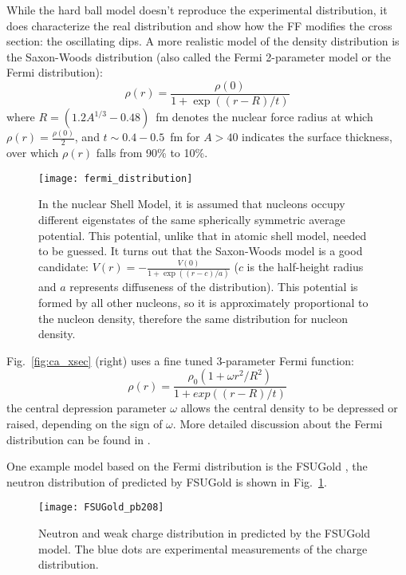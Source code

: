 While the hard ball model doesn't reproduce the experimental distribution, it does
characterize the real distribution and show how the FF modifies the cross section:
the oscillating dips. A more realistic model of the density distribution is the
Saxon-Woods distribution (also called the Fermi 2-parameter model or the Fermi
distribution):
\begin{equation}
    \rho(r) = \frac{\rho(0)}{1 + \exp((r-R)/t)}
\end{equation}
where $R = (1.2A^{1/3} - 0.48)$~fm denotes the nuclear force radius at which 
$\rho(r) = \frac{\rho(0)}{2}$,
and $t \sim 0.4-0.5$~fm for  $A > 40$ indicates the surface thickness, 
over which $\rho(r)$ falls from 90\% to 10\%.
\begin{figure}[!h]
    \centering
    \texttt{[image: fermi\_distribution]}
    \caption{In the nuclear Shell Model, it is assumed that nucleons occupy 
    different eigenstates of the same spherically symmetric average potential.
    This potential, unlike that in atomic shell model, needed to be guessed. 
    It turns out that the Saxon-Woods model is a good candidate: 
    $V(r) = -\frac{V(0)}{1+\exp((r-c)/a)}$ ($c$ is the half-height radius and $a$ represents
    diffuseness of the distribution). This potential is formed
    by all other nucleons, so it is approximately proportional to the nucleon density, 
    therefore the same distribution for nucleon density.} 
\end{figure}

Fig.~\ref{fig:ca_xsec} (right) uses a fine tuned 3-parameter Fermi function:
\begin{equation}
    \rho(r) = \frac{\rho_0(1 + \omega r^2/R^2)}{1 + exp((r-R)/t)}
    \label{eq:3-para_Fermi}
\end{equation}
the central depression parameter $\omega$ allows the central density to be depressed
or raised, depending on the sign of $\omega$. More detailed discussion about the Fermi 
distribution can be found in \cite{Maximon:1966sqn}.

One example model based on the Fermi distribution is the FSUGold \cite{PhysRevLett.95.122501},
the neutron distribution of \Pb predicted by FSUGold is shown in Fig.~\ref{fig:FSUGold_pb208}.
\begin{figure}[!h]
    \centering
    \texttt{[image: FSUGold\_pb208]}
    \caption{Neutron and weak charge distribution in \Pb predicted by the FSUGold model.
    The blue dots are experimental measurements of the charge distribution.}
    \label{fig:FSUGold_pb208}
\end{figure}


